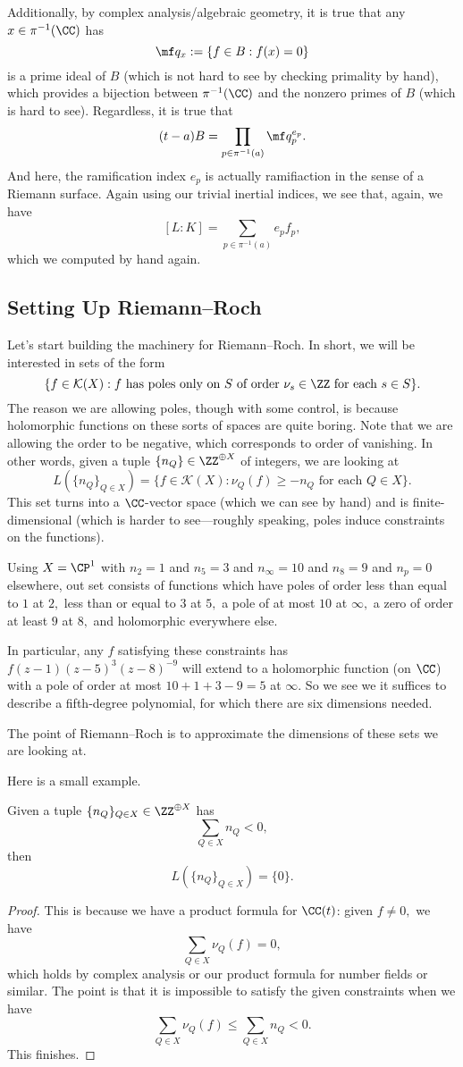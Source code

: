 Additionally, by complex analysis/algebraic geometry, it is true that any $x\in\pi^{-1}(\CC)$ has
\[\mf q_x:=\{f\in B:f(x)=0\}\]
is a prime ideal of $B$ (which is not hard to see by checking primality by hand), which provides a bijection between $\pi^{-1}(\CC)$ and the nonzero primes of $B$ (which is hard to see). Regardless, it is true that
\[(t-a)B=\prod_{p\in\pi^{-1}(a)}\mf q_p^{e_p}.\]
And here, the ramification index $e_p$ is actually ramifiaction in the sense of a Riemann surface. Again using our trivial inertial indices, we see that, again, we have
\[[L:K]=\sum_{p\in\pi^{-1}(a)}e_pf_p,\]
which we computed by hand again.

\subsection{Setting Up Riemann--Roch}
Let's start building the machinery for Riemann--Roch. In short, we will be interested in sets of the form
\[\{f\in\mathcal K(X):f\text{ has poles only on }S\text{ of order }\nu_s\in\ZZ\text{ for each }s\in S\}.\]
The reason we are allowing poles, though with some control, is because holomorphic functions on these sorts of spaces are quite boring. Note that we are allowing the order to be negative, which corresponds to order of vanishing. In other words, given a tuple $\{n_Q\}\in\ZZ^{\oplus X}$ of integers, we are looking at
\[L(\{n_Q\}_{Q\in X})=\{f\in\mathcal K(X):\nu_Q(f)\ge-n_Q\text{ for each }Q\in X\}.\]
This set turns into a $\CC$-vector space (which we can see by hand) and is finite-dimensional (which is harder to see---roughly speaking, poles induce constraints on the functions).
\begin{example}
	Using $X=\CP^1$ with $n_2=1$ and $n_5=3$ and $n_\infty=10$ and $n_8=9$ and $n_p=0$ elsewhere, out set consists of functions which have poles of order less than equal to $1$ at $2,$ less than or equal to $3$ at $5,$ a pole of at most $10$ at $\infty,$ a zero of order at least $9$ at $8,$ and holomorphic everywhere else.

	In particular, any $f$ satisfying these constraints has $f(z-1)(z-5)^3(z-8)^{-9}$ will extend to a holomorphic function (on $\CC$) with a pole of order at most $10+1+3-9=5$ at $\infty.$ So we see we it suffices to describe a fifth-degree polynomial, for which there are six dimensions needed.
\end{example}
The point of Riemann--Roch is to approximate the dimensions of these sets we are looking at.

Here is a small example.
\begin{proposition}
	Given a tuple $\{n_Q\}_{Q\in X}\in\ZZ^{\oplus X}$ has
	\[\sum_{Q\in X}n_Q<0,\]
	then
	\[L(\{n_Q\}_{Q\in X})=\{0\}.\]
\end{proposition}
\begin{proof}
	This is because we have a product formula for $\CC(t)$: given $f\ne0,$ we have
	\[\sum_{Q\in X}\nu_Q(f)=0,\]
	which holds by complex analysis or our product formula for number fields or similar. The point is that it is impossible to satisfy the given constraints when we have
	\[\sum_{Q\in X}\nu_Q(f)\le\sum_{Q\in X}n_Q<0.\]
	This finishes.
\end{proof}

